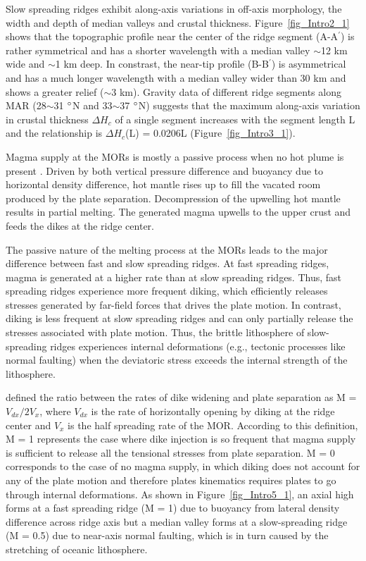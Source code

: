 \documentclass[draft,gc]{agutex}
\begin{document}
\begin{article}
Slow spreading ridges exhibit along-axis variations in off-axis morphology, the width and depth of median valleys and crustal thickness.  Figure~\ref{fig_Intro2_1} shows that the topographic profile near the center of the ridge segment (A-A$^{\prime}$) is rather symmetrical and has a shorter wavelength with a median valley $\sim$12 km wide and $\sim$1 km deep. In constrast, the near-tip profile (B-B$^{\prime}$) is asymmetrical and has a much longer wavelength with a median valley wider than 30 km and shows a greater relief ($\sim$3 km). Gravity data of different ridge segments along MAR (28$\sim$31 $\degree$N and 33$\sim$37 $\degree$N) suggests that the maximum along-axis variation in crustal thickness $\Delta H_{c}$ of a single segment increases with the segment length L \citep{Chen1999} and the relationship is $\Delta H_{c}$(L) = 0.0206L (Figure~\ref{fig_Intro3_1}).

Magma supply at the MORs is mostly a passive process when no hot plume is present \citep{Fowler2004}. Driven by both vertical pressure difference and buoyancy due to horizontal density difference, hot mantle rises up to fill the vacated room produced by the plate separation. Decompression of the upwelling hot mantle results in partial melting. The generated magma upwells to the upper crust and feeds the dikes at the ridge center.

The passive nature of the melting process at the MORs leads to the major difference between fast and slow spreading ridges. At fast spreading ridges, magma is generated at a higher rate than at slow spreading ridges. Thus, fast spreading ridges experience more frequent diking, which efficiently releases stresses generated by far-field forces that drives the plate motion. In contrast, diking is less frequent at slow spreading ridges and can only partially release the stresses associated with plate motion. Thus, the brittle lithosphere of slow-spreading ridges experiences internal deformations (e.g., tectonic processes like normal faulting) when the deviatoric stress exceeds the internal strength of the lithosphere.

\citet{Buck2005} defined the ratio between the rates of dike widening and plate separation as M = $V_{dx}/2V_{x}$, where $V_{dx}$ is the rate of horizontally opening by diking at the ridge center and $V_{x}$ is the half spreading rate of the MOR. According to this definition, M = 1 represents the case where dike injection is so frequent that magma supply is sufficient to release all the tensional stresses from plate separation. M = 0 corresponds to the case of no magma supply, in which diking does not account for any of the plate motion and therefore plates kinematics requires plates to go through internal deformations. As shown in Figure~\ref{fig_Intro5_1}, an axial high forms at a fast spreading ridge (M = 1) due to buoyancy from lateral density difference across ridge axis but a median valley forms at a slow-spreading ridge (M = 0.5) due to near-axis normal faulting, which is in turn caused by the stretching of oceanic lithosphere.


\end{article}
\end{document}

